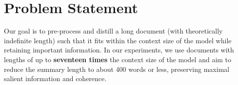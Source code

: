 \section{Problem Statement}
\label{sec:problem}

Our goal is to pre-process and distill a long document (with theoretically indefinite length) such that it fits within the context size of the model while retaining important information.
In our experiments, we use documents with lengths of up to \textbf{seventeen times} the context size of the model and aim to reduce the summary length to about 400 words or less, preserving maximal salient information and coherence.
